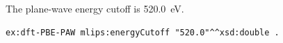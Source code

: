 The plane-wave energy cutoff is 520.0~eV.
\begin{lstlisting}[language=turtle]
ex:dft-PBE-PAW mlips:energyCutoff "520.0"^^xsd:double .
\end{lstlisting}
